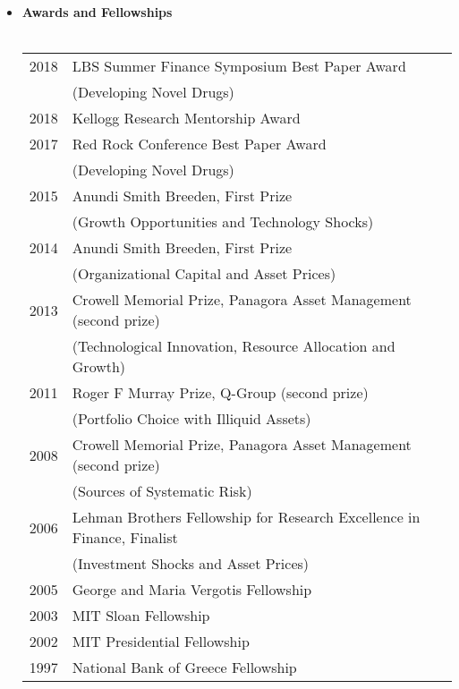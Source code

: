 \documentclass[12pt,letterpaper,serif,overlapped]{res}
\begin{document}
\begin{resume}
\begin{itemize}
\item \textbf{Awards and Fellowships}\\ \\
\begin{tabular}{ll}
2018 & LBS  Summer Finance Symposium Best Paper Award \\ &  (Developing Novel Drugs)\\
2018 & Kellogg Research Mentorship Award\\
2017 & Red Rock Conference Best Paper Award \\ &  (Developing Novel Drugs)\\
2015 & Anundi Smith Breeden, First Prize\\ &  (Growth Opportunities and Technology Shocks)\\
2014 & Anundi Smith Breeden, First Prize \\ & (Organizational Capital and Asset Prices)\\
2013 & Crowell Memorial Prize, Panagora Asset Management (second prize)\\& (Technological Innovation, Resource Allocation and Growth)\\
2011 & Roger F Murray Prize, Q-Group (second prize)\\ & (Portfolio Choice with Illiquid Assets)\\
2008 & Crowell Memorial Prize, Panagora Asset Management (second prize) \\ & (Sources of Systematic Risk) \\
2006  & Lehman Brothers Fellowship for Research Excellence in Finance, Finalist\\ & (Investment Shocks and Asset Prices)\\
2005 & George and Maria Vergotis Fellowship\\
2003& MIT Sloan Fellowship\\
2002 & MIT Presidential Fellowship\\
1997 & National Bank of Greece Fellowship \\
\end{tabular}

\end{itemize}



\end{resume}
\end{document}
